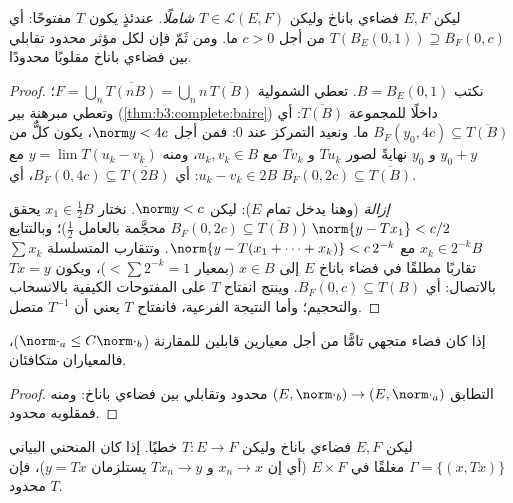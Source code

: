 \begin{theorem}\label{thm:b3:banach:openmapping}
ليكن $E, F$ فضاءي باناخ وليكن $T \in \mathcal L(E, F)$ \emph{شاملًا}. عندئذٍ
يكون $T$ مفتوحًا: أي $T(B_E(0,1)) \supseteq
B_F(0, c)$ من أجل $c > 0$ ما. ومن ثَمّ فإن
لكل مؤثر محدود تقابلي بين فضاءي باناخ مقلوبًا محدودًا.
\end{theorem}

\begin{proof}
نكتب $B = B_E(0,1)$. تعطي الشمولية $F = \bigcup_n
\overline{T(nB)} = \bigcup_n n\,\overline{T(B)}$؛ وتعطي مبرهنة بير
(\cref{thm:b3:complete:baire}) داخلًا للمجموعة $\overline{T(B)}$: أي $B_F(y_0, 4c) \subseteq
\overline{T(B)}$ ما. ونعيد
التمركز عند $0$: فمن أجل $\norm y < 4c$، يكون كلٌّ من $y_0 + y$
و $y_0$ نهايةً لصور $Tu_k$ و $Tv_k$ مع $u_k, v_k \in B$، ومنه
$y = \lim T(u_k - v_k)$ مع $u_k - v_k
\in 2B$: أي $B_F(0, 4c) \subseteq \overline{T(2B)}$، أي $B_F(0, 2c) \subseteq \overline{T(B)}$.

\emph{إزالة } (وهنا يدخل تمام $E$): ليكن $\norm y < c$.
نختار $x_1 \in \frac12 B$ يحقق $\norm{y -
Tx_1} < c/2$ ($B_F(0,2c) \subseteq \overline{T(B)}$ محجَّمة بالعامل
$\frac12$)؛ وبالتتابع $x_k \in 2^{-k}B$ مع $\norm{y -
T(x_1 + \dots + x_k)} < c\,2^{-k}$. وتتقارب المتسلسلة
$\sum x_k$ تقاربًا مطلقًا في فضاء باناخ $E$ إلى $x \in B$
(بمعيار $<
\sum 2^{-k} = 1$)، ويكون $Tx = y$ بالاتصال: أي $B_F(0, c)
\subseteq T(B)$. وينتج
انفتاح $T$ على المفتوحات الكيفية بالانسحاب والتحجيم؛ وأما
النتيجة الفرعية، فانفتاح $T$ يعني أن $T^{-1}$ متصل.
\end{proof}

\begin{corollary}\label{cor:b3:banach:equivnorms}
إذا كان فضاء متجهي تامًّا من أجل معيارين قابلين للمقارنة
($\norm\cdot_a \leq C\norm\cdot_b$)، فالمعياران متكافئان.
\end{corollary}

\begin{proof}
التطابق $(E, \norm\cdot_b) \to (E, \norm\cdot_a)$ محدود وتقابلي بين فضاءي باناخ: ومنه فمقلوبه
محدود.
\end{proof}

\begin{theorem}\label{thm:b3:banach:closedgraph}
ليكن $E, F$ فضاءي باناخ وليكن $T \colon E \to F$ خطيًا. إذا كان المنحني
البياني $\Gamma = \{(x, Tx)\}$ مغلقًا في $E \times F$ (أي إن $x_n \to x$
و $Tx_n \to y$ يستلزمان $y = Tx$)، فإن $T$ محدود.
\end{theorem}

